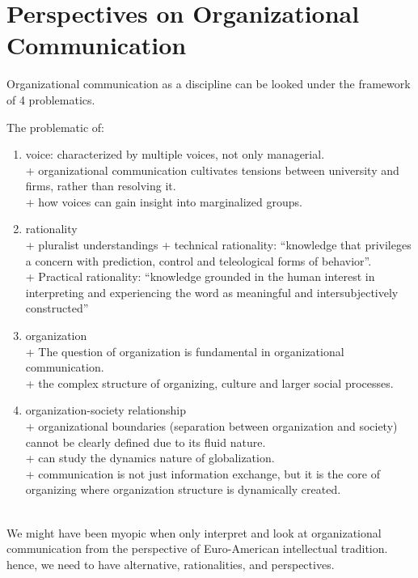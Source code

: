 \documentclass[
]{book}
\providecommand{\tightlist}{%
  \setlength{\itemsep}{0pt}\setlength{\parskip}{0pt}}
\begin{document}
\hypertarget{perspectives-on-organizational-communication}{%
\chapter{Perspectives on Organizational Communication}\label{perspectives-on-organizational-communication}}

\citep{Mumby_1996}
Organizational communication as a discipline can be looked under the framework of 4 problematics.

The problematic of:

\begin{enumerate}
\def\labelenumi{\arabic{enumi}.}
\tightlist
\item
  voice: characterized by multiple voices, not only managerial.\\
  + organizational communication cultivates tensions between university and firms, rather than resolving it.\\
  + how voices can gain insight into marginalized groups.\\
\item
  rationality\\
  + pluralist understandings
  + technical rationality: ``knowledge that privileges a concern with prediction, control and teleological forms of behavior''.\\
  + Practical rationality: ``knowledge grounded in the human interest in interpreting and experiencing the word as meaningful and intersubjectively constructed''\\
\item
  organization\\
  + The question of organization is fundamental in organizational communication.\\
  + the complex structure of organizing, culture and larger social processes.\\
\item
  organization-society relationship\\
  + organizational boundaries (separation between organization and society) cannot be clearly defined due to its fluid nature.\\
  + can study the dynamics nature of globalization.\\
  + communication is not just information exchange, but it is the core of organizing where organization structure is dynamically created.
\end{enumerate}

\citep{Broadfoot_2007}~\\
We might have been myopic when only interpret and look at organizational communication from the perspective of Euro-American intellectual tradition. hence, we need to have alternative, rationalities, and perspectives.
\end{document}
